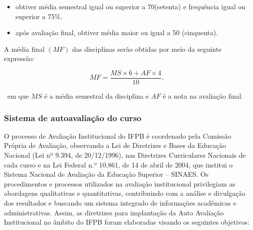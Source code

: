\begin{itemize}
	\item obtiver média semestral igual ou superior a 70(setenta) e frequência igual ou superior a 75\%. 
	\item após avaliação final, obtiver média maior ou igual a 50 (cinquenta). 
\end{itemize}

A média final $(MF)$ das disciplinas serão obtidas por meio da seguinte expressão:

$$ MF = \frac{MS \times 6 + AF \times 4}{10}, $$

~em que $MS$ é a média semestral da disciplina e $AF$ é a nota na avaliação final.

\subsubsection{Sistema de autoavaliação do curso}

O processo de Avaliação Institucional do IFPB é coordenado pela Comissão Própria de Avaliação, observando a Lei de Diretrizes e Bases da Educação Nacional (Lei nº 9.394, de 20/12/1996), nas Diretrizes Curriculares Nacionais de cada curso e na Lei Federal n.º 10.861, de 14 de abril de 2004, que institui o Sistema Nacional de Avaliação da Educação Superior – SINAES. Os procedimentos e processos utilizados na avaliação institucional privilegiam as abordagens qualitativas e quantitativas, contribuindo com a análise e divulgação dos resultados e buscando um sistema integrado de informações acadêmicas e administrativas. Assim, as diretrizes para implantação da Auto Avaliação Institucional no âmbito do IFPB foram elaboradas visando os seguintes objetivos:

